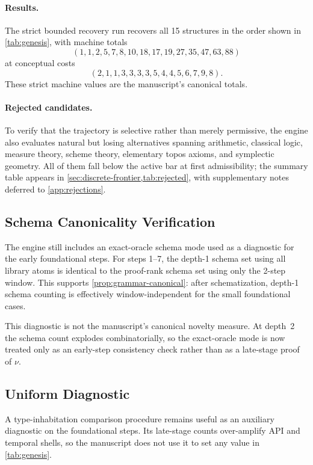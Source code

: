 \documentclass[11pt,a4paper]{article}
\theoremstyle{plain}
\theoremstyle{definition}
\theoremstyle{remark}
\begin{document}
\paragraph{Results.}
The strict bounded recovery run recovers all 15 structures in the order shown in \cref{tab:genesis}, with machine totals
\[
  (1,1,2,5,7,8,10,18,17,19,27,35,47,63,88)
\]
at conceptual costs
\[
  (2,1,1,3,3,3,3,5,4,4,5,6,7,9,8).
\]
These strict machine values are the manuscript's canonical totals.

\paragraph{Rejected candidates.}
To verify that the trajectory is selective rather than merely permissive, the engine also evaluates natural but losing alternatives spanning arithmetic, classical logic, measure theory, scheme theory, elementary topos axioms, and symplectic geometry.
All of them fall below the active bar at first admissibility; the summary table appears in \cref{sec:discrete-frontier,tab:rejected}, with supplementary notes deferred to \cref{app:rejections}.

\subsection{Schema Canonicality Verification}

The engine still includes an exact-oracle schema mode used as a diagnostic for the early foundational steps.
For steps 1--7, the depth-1 schema set using all library atoms is identical to the proof-rank schema set using only the 2-step window.
This supports \cref{prop:grammar-canonical}: after schematization, depth-1 schema counting is effectively window-independent for the small foundational cases.

This diagnostic is not the manuscript's canonical novelty measure.
At depth~2 the schema count explodes combinatorially, so the exact-oracle mode is now treated only as an early-step consistency check rather than as a late-stage proof of $\nu$.

\subsection{Uniform Diagnostic}
\label{sec:uniform-nu}

A type-inhabitation comparison procedure remains useful as an auxiliary diagnostic on the foundational steps.
Its late-stage counts over-amplify API and temporal shells, so the manuscript does not use it to set any value in \cref{tab:genesis}.
\end{document}
